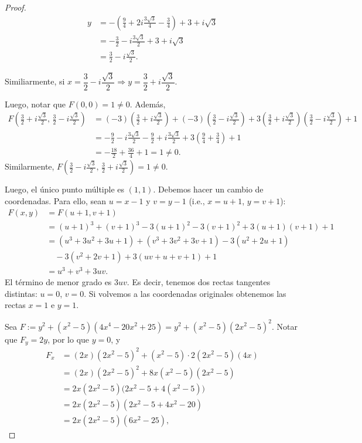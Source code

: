 \documentclass[12pt,a4paper]{article}
\theoremstyle{plain}
\begin{document}
\begin{proof}
	\begin{align*}
	  y &= -\left(\frac{9}{4}+2i\frac{3\sqrt{3}}{4}-\frac{3}{4}\right)+3+i\sqrt{3}\\
		&= -\frac{3}{2}-i\frac{3\sqrt{3}}{2}+3+i\sqrt{3}\\
		&= \frac{3}{2}-i\frac{\sqrt{3}}{2}.
	\end{align*}

	\par Similiarmente, si $x=\dfrac{3}{2}-i\dfrac{\sqrt{3}}{2}\Rightarrow y=\dfrac{3}{2}+i\dfrac{\sqrt{3}}{2}$.

	Luego, notar que $F(0,0)=1\neq 0$. Además,
	\begin{align*}
	  F\!\left(\tfrac{3}{2}+i\tfrac{\sqrt{3}}{2},\,\tfrac{3}{2}-i\tfrac{\sqrt{3}}{2}\right)
	  &= (-3)\!\left(\tfrac{3}{2}+i\tfrac{\sqrt{3}}{2}\right)+(-3)\!\left(\tfrac{3}{2}-i\tfrac{\sqrt{3}}{2}\right)
		+3\!\left(\tfrac{3}{2}+i\tfrac{\sqrt{3}}{2}\right)\!\left(\tfrac{3}{2}-i\tfrac{\sqrt{3}}{2}\right)+1\\
	  &= -\tfrac{9}{2}-i\tfrac{3\sqrt{3}}{2}-\tfrac{9}{2}+i\tfrac{3\sqrt{3}}{2}
		+3\!\left(\tfrac{9}{4}+\tfrac{3}{4}\right)+1\\
	  &= -\tfrac{18}{2}+\tfrac{36}{4}+1 = 1\neq 0.
	\end{align*}
	Similarmente, $F\!\left(\tfrac{3}{2}-i\tfrac{\sqrt{3}}{2},\,\tfrac{3}{2}+i\tfrac{\sqrt{3}}{2}\right)=1\neq 0$.

	Luego, el único punto múltiple es $(1,1)$. Debemos hacer un cambio de coordenadas. Para ello, sean $u=x-1$ y $v=y-1$ (i.e., $x=u+1$, $y=v+1$):
	\begin{align*}
	  F(x,y) &= F(u+1,v+1)\\
	  &= (u+1)^3+(v+1)^3-3(u+1)^2-3(v+1)^2+3(u+1)(v+1)+1\\
	  &= (u^3+3u^2+3u+1)+(v^3+3v^2+3v+1)-3(u^2+2u+1)\\
	  &\quad -3(v^2+2v+1)+3(uv+u+v+1)+1\\
	  &= u^3+v^3+3uv.
	\end{align*}
	El término de menor grado es $3uv$. Es decir, tenemos dos rectas tangentes distintas: $u=0$, $v=0$. Si volvemos a las coordenadas originales obtenemos las rectas $x=1$ e $y=1$.

	\bigskip
	 Sea $F:=y^2+(x^2-5)(4x^4-20x^2+25)=y^2+(x^2-5)(2x^2-5)^2$. Notar que $F_y = 2y$, por lo que $y = 0$, y
	\begin{align*}
	  F_x &= (2x)(2x^2-5)^2+(x^2-5)\cdot 2(2x^2-5)(4x)\\
		  &= (2x)(2x^2-5)^2+8x(x^2-5)(2x^2-5)\\
		  &= 2x(2x^2-5)\bigl(2x^2-5+4(x^2-5)\bigr)\\
		  &= 2x(2x^2-5)(2x^2-5+4x^2-20)\\
		  &= 2x(2x^2-5)(6x^2-25),
	\end{align*}


\end{proof}
\end{document}
